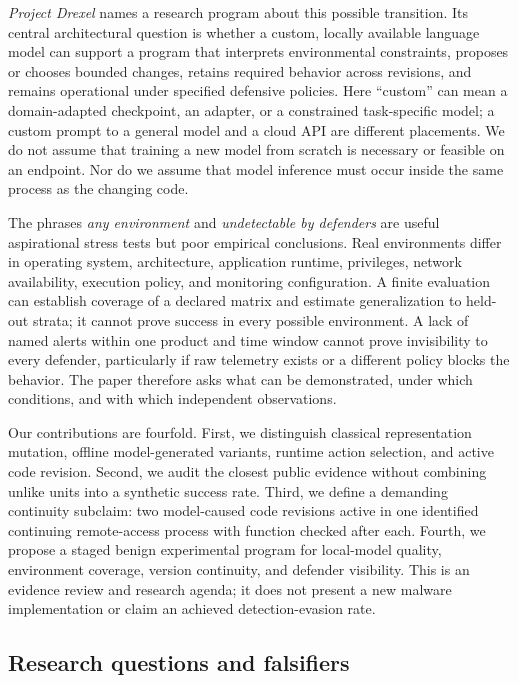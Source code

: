 \documentclass[11pt,letterpaper]{article}
\begin{document}
\emph{Project Drexel} names a research program about this possible transition. Its central architectural question is whether a custom, locally available language model can support a program that interprets environmental constraints, proposes or chooses bounded changes, retains required behavior across revisions, and remains operational under specified defensive policies. Here ``custom'' can mean a domain-adapted checkpoint, an adapter, or a constrained task-specific model; a custom prompt to a general model and a cloud API are different placements. We do not assume that training a new model from scratch is necessary or feasible on an endpoint. Nor do we assume that model inference must occur inside the same process as the changing code.

The phrases \emph{any environment} and \emph{undetectable by defenders} are useful aspirational stress tests but poor empirical conclusions. Real environments differ in operating system, architecture, application runtime, privileges, network availability, execution policy, and monitoring configuration. A finite evaluation can establish coverage of a declared matrix and estimate generalization to held-out strata; it cannot prove success in every possible environment. A lack of named alerts within one product and time window cannot prove invisibility to every defender, particularly if raw telemetry exists or a different policy blocks the behavior. The paper therefore asks what can be demonstrated, under which conditions, and with which independent observations.

Our contributions are fourfold. First, we distinguish classical representation mutation, offline model-generated variants, runtime action selection, and active code revision. Second, we audit the closest public evidence without combining unlike units into a synthetic success rate. Third, we define a demanding continuity subclaim: two model-caused code revisions active in one identified continuing remote-access process with function checked after each. Fourth, we propose a staged benign experimental program for local-model quality, environment coverage, version continuity, and defender visibility. This is an evidence review and research agenda; it does not present a new malware implementation or claim an achieved detection-evasion rate.

\subsection{Research questions and falsifiers}
\end{document}
